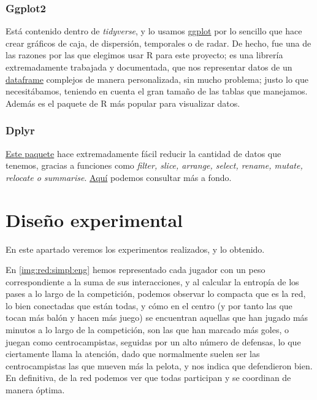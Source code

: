 \subsubsection{Ggplot2}
Está contenido dentro de \textit{tidyverse}, y lo usamos \href{https://ggplot2.tidyverse.org/}{ggplot} por lo sencillo que hace crear gráficos de caja, de dispersión, 
temporales o de radar. De hecho, fue una de las razones por las que elegimos usar R para este proyecto; es una 
librería extremadamente trabajada y documentada, que nos representar datos de un 
\href{https://www.rdocumentation.org/packages/base/versions/3.6.2/topics/data.frame}{dataframe} complejos de 
manera personalizada, sin mucho problema; justo lo que necesitábamos, teniendo en cuenta el gran tamaño de las 
tablas que manejamos. Además es el paquete de R más popular para visualizar datos.

\subsubsection{Dplyr}
\href{https://cran.r-project.org/web/packages/dplyr/vignettes/dplyr.html}{Este paquete} hace extremadamente fácil 
reducir la cantidad de datos que tenemos, gracias a funciones como \textit{filter, slice, arrange, select, rename, mutate, 
relocate o summarise}. \href{https://dplyr.tidyverse.org/}{Aquí} podemos consultar más a fondo.

\section{Diseño experimental}
En este apartado veremos los experimentos realizados, y lo obtenido.

En \ref{img:red:simpl:eng} hemos representado cada jugador con un peso correspondiente a la suma de sus interacciones, y al calcular 
la entropía de los pases a lo largo de la competición, podemos observar lo compacta que es la red, lo bien 
conectadas que están todas, y cómo en el centro (y por tanto las que tocan más balón y hacen más juego) se 
encuentran aquellas que han jugado más minutos a lo largo de la competición, son las que han marcado más goles, 
o juegan como centrocampistas, seguidas por un alto número de defensas, lo que ciertamente llama la atención, dado 
que normalmente suelen ser las centrocampistas las que mueven más la pelota, y nos indica que defendieron bien. 
En definitiva, de la red podemos ver que todas participan y se coordinan de manera óptima.

